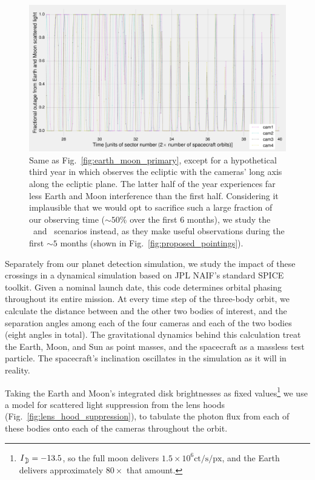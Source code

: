 \begin{figure}[!t]
	\centering
	\includegraphics[angle=90,width=\textwidth]{figures/outage_earth_moon_ecl_narrow_1yr.pdf}
	\caption{Same as Fig.~\protect\ref{fig:earth_moon_primary}, except for a hypothetical third year in which \tess observes the ecliptic with the cameras' long axis along the ecliptic plane. The latter half of the year experiences far less Earth and Moon interference than the first half. Considering it implausible that we would opt to sacrifice such a large fraction of our observing time ($\sim 50\%$ over the first 6 months), we study the \elong\ and \eshort\ scenarios instead, as they make useful observations during the first $\sim5$ months (shown in Fig.~\protect\ref{fig:proposed_pointings}).}
	\label{fig:earth_moon_elong}
\end{figure}

Separately from our planet detection simulation, we study the impact of these crossings in a dynamical simulation based on JPL NAIF's standard SPICE toolkit.
Given a nominal launch date, this code determines \tesss orbital phasing throughout its entire mission. 
At every time step of the three-body orbit, we calculate the distance between \tess and the other two bodies of interest, and the separation angles among each of the four cameras and each of the two bodies (eight angles in total). 
The gravitational dynamics behind this calculation treat the Earth, Moon, and Sun as point masses, and the \tess spacecraft as a massless test particle.
The spacecraft's inclination oscillates in the simulation as it will in reality.

Taking the Earth and Moon's integrated disk brightnesses as fixed values\footnote{$I_\moon = -13.5$, so the full moon delivers $1.5\times10^6 \text{ct/s/px}$, and the Earth delivers approximately $80\times$ that amount.} we use a model for scattered light suppression from the \tess lens hoods (Fig.~\ref{fig:lens_hood_suppression}), to tabulate the photon flux from each of these bodies onto each of the cameras throughout the orbit.

